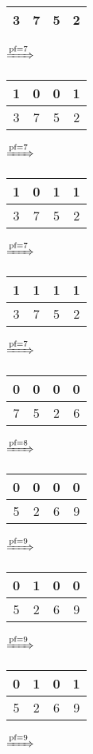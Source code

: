 \documentclass{article}
\begin{document}
\begin{enumerate}
\begin{tabular}{|c|c|c|c|}
         \hline
         3 & 7 & 5 & 2\\
         \hline
      \end{tabular}
      $\xRightarrow{\text{pf}=7}$
      \begin{tabular}{|c|c|c|c|}
         \hline
         1 & 0 & 0 & 1\\
         \hline
         3 & 7 & 5 & 2\\
         \hline
      \end{tabular}
      $\xRightarrow{\text{pf}=7}$
      \begin{tabular}{|c|c|c|c|}
         \hline
         1 & 0 & 1 & 1\\
         \hline
         3 & 7 & 5 & 2\\
         \hline
      \end{tabular}
      $\xRightarrow{\text{pf}=7}$
      \begin{tabular}{|c|c|c|c|}
         \hline
         1 & 1 & 1 & 1\\
         \hline
         3 & 7 & 5 & 2\\
         \hline
      \end{tabular}
      $\xRightarrow{\text{pf}=7}$
      \begin{tabular}{|c|c|c|c|}
         \hline
         0 & 0 & 0 & 0\\
         \hline
         7 & 5 & 2 & 6\\
         \hline
      \end{tabular}
      $\xRightarrow{\text{pf}=8}$
      \begin{tabular}{|c|c|c|c|}
         \hline
         0 & 0 & 0 & 0\\
         \hline
         5 & 2 & 6 & 9\\
         \hline
      \end{tabular}
      $\xRightarrow{\text{pf}=9}$
      \begin{tabular}{|c|c|c|c|}
         \hline
         0 & 1 & 0 & 0\\
         \hline
         5 & 2 & 6 & 9\\
         \hline
      \end{tabular}
      $\xRightarrow{\text{pf}=9}$
      \begin{tabular}{|c|c|c|c|}
         \hline
         0 & 1 & 0 & 1\\
         \hline
         5 & 2 & 6 & 9\\
         \hline
      \end{tabular}
      $\xRightarrow{\text{pf}=9}$

\end{enumerate}
\end{document}
